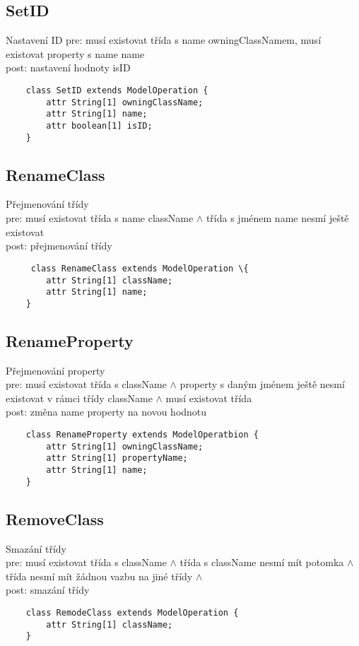 \documentclass[11pt,a4paper]{article}
\begin{document}
	\subsection{SetID}
	Nastavení ID
	pre: musí existovat třída s name owningClassNamem, musí existovat property
	s name name\\
	post: nastavení hodnoty isID
	\begin{verbatim}
	class SetID extends ModelOperation {
        attr String[1] owningClassName;
        attr String[1] name;
        attr boolean[1] isID;
    }
	\end{verbatim}    

    	
	\subsection{RenameClass}
	Přejmenování třídy \\
	pre: musí existovat třída s name className	$\wedge$ třída s jménem name
	nesmí ještě existovat\\ 
	post: přejmenování třídy \\
	\begin{verbatim}
     class RenameClass extends ModelOperation \{
        attr String[1] className;
        attr String[1] name;
    }
	\end{verbatim}
	
	\subsection{RenameProperty}
	Přejmenování property \\
	pre: musí existovat třída s className $\wedge$ property s daným jménem
	ještě nesmí existovat v rámci třídy className $\wedge$ musí existovat třída \\ 
	post: změna name property na novou hodnotu\\
	\begin{verbatim}
    class RenameProperty extends ModelOperatbion {
        attr String[1] owningClassName;
        attr String[1] propertyName; 
        attr String[1] name; 
    }
	\end{verbatim}
	
	\subsection{RemoveClass}
	Smazání třídy \\
	pre: musí existovat třída s className $\wedge$ třída s className nesmí mít
	potomka $\wedge$ třída nesmí mít žádnou vazbu na jiné třídy
	$\wedge$ \\
	 post: smazání třídy \\
	\begin{verbatim}
    class RemodeClass extends ModelOperation {
        attr String[1] className;
    }
	\end{verbatim}
	
\end{document}
